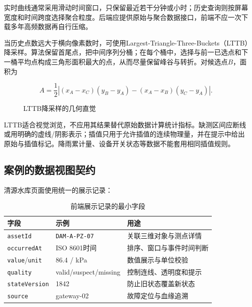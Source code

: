 实时曲线通常采用滑动时间窗口，只保留最近若干分钟或小时；历史查询则按屏幕宽度和时间跨度选择聚合粒度。后端应提供原始与聚合数据接口，前端不应一次下载多年高频数据再自行压缩。

当历史点数远大于横向像素数时，可使用Largest-Triangle-Three-Buckets（LTTB）降采样。算法保留首尾点，把中间序列分桶；在每个桶中，选择与前一已选点和下一桶平均点构成三角形面积最大的点，从而尽量保留峰谷与转折\cite{steinarsson2013lttb}。对候选点$B$，面积为

\[
A=\frac{1}{2}\left|
(x_A-x_C)(y_B-y_A)-(x_A-x_B)(y_C-y_A)
\right|.
\]

\begin{figure}[htbp]
\centering
{}
\caption{LTTB降采样的几何直觉}
\label{fig:lttb-principle}
\end{figure}

LTTB适合视觉浏览，不应用其结果替代原始数据计算统计指标。缺测区间应断线或用明确的虚线/阴影表示；插值只用于允许插值的连续物理量，并在提示中给出原始与插值标记。降雨累计量、设备开关状态等数据不能套用相同插值规则。

\subsection{案例的数据视图契约}

清源水库页面使用统一的展示记录：

\begin{table}[htbp]
\centering
\caption{前端展示记录的最小字段}
\label{tab:ch7-view-contract}
\begin{tabular}{p{2.7cm}p{4.2cm}p{5.5cm}}
\toprule
字段 & 示例 & 用途 \\
\midrule
\texttt{assetId} & \texttt{DAM-A-PZ-07} & 关联三维对象与测点详情 \\
\texttt{occurredAt} & ISO 8601时间 & 排序、窗口与事件时间判断 \\
\texttt{value}/\texttt{unit} & 86.4 / kPa & 数值展示与单位校验 \\
\texttt{quality} & valid/suspect/missing & 控制连线、透明度和提示 \\
\texttt{stateVersion} & 1842 & 防止旧状态覆盖新状态 \\
\texttt{source} & gateway-02 & 故障定位与血缘追溯 \\
\bottomrule
\end{tabular}
\end{table}

